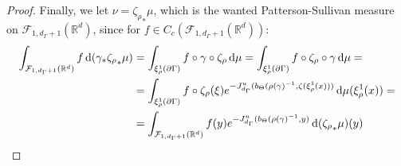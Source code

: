 \documentclass{report}
\begin{document}
\begin{proof}
    Finally, we let $\nu = {\zeta_\rho}_* \mu$, which is the wanted Patterson-Sullivan measure on $\mathcal F_{1, d_\Gamma + 1} (\mathbb R^d)$, since for $f \in C_c(\mathcal F_{1, d_\Gamma + 1} (\mathbb R^d))$:
    \begin{align*}
        \int_{\mathcal F_{1, d_\Gamma + 1} (\mathbb R^d)} f \,\mathrm{d}(\gamma_* {\zeta_\rho}_* \mu) &=
        \int_{\xi_\rho^1(\partial \Gamma)} f \circ \gamma \circ \zeta_\rho \,\mathrm{d} \mu =
        \int_{\xi_\rho^1(\partial \Gamma)} f \circ \zeta_\rho \circ \gamma \,\mathrm{d} \mu =\\
        &=
        \int_{\xi_\rho^1(\partial \Gamma)} f \circ \zeta_\rho(\xi) e^{-J_{d_\Gamma}^u(b_\Theta(\rho(\gamma)^{-1}, \zeta(\xi_\rho^1(x)))} \,\mathrm{d} \mu(\xi_\rho^1(x)) =\\
        &=
        \int_{\mathcal F_{1, d_\Gamma + 1} (\mathbb R^d)} 
        f(y) e^{-J_{d_\Gamma}^u(b_\Theta(\rho(\gamma)^{-1}, y)} \,\mathrm{d} ({\zeta_\rho}_*\mu)(y)
    \end{align*}
\end{proof}
\end{document}
